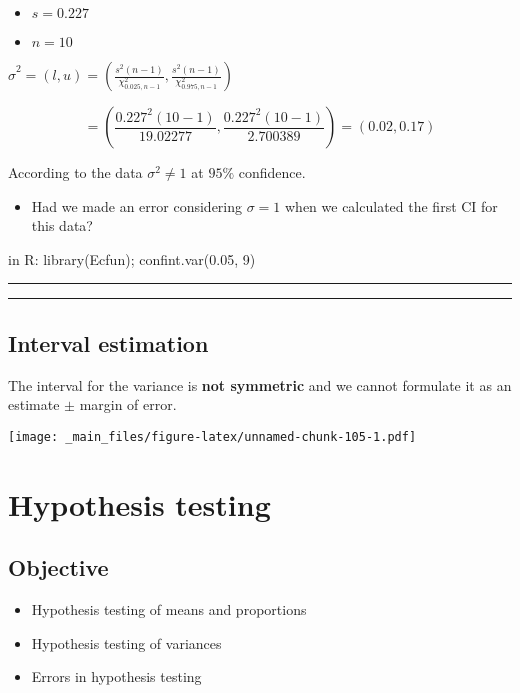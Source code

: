 \documentclass[
]{book}
\providecommand{\tightlist}{%
  \setlength{\itemsep}{0pt}\setlength{\parskip}{0pt}}
\begin{document}
\begin{itemize}
\tightlist
\item
  \(s=0.227\)
\item
  \(n=10\)
\end{itemize}

\(\hat{\sigma}^2=(l,u) = (\frac{s^2 (n-1)}{\chi^2_{0.025,n-1}},\frac{s^2(n-1)}{\chi^2_{0.975,n-1}})\)

\[= (\frac{0.227^2 (10-1)}{19.02277},\frac{0.227^2(10-1)}{2.700389})=(0.02,0.17)\]

According to the data \(\sigma^2 \neq 1\) at \(95\%\) confidence.

\begin{itemize}
\tightlist
\item
  Had we made an error considering \(\sigma=1\) when we calculated the first CI for this data?
\end{itemize}

in R: library(Ecfun);
confint.var(0.05, 9)

\begin{center}\rule{0.5\linewidth}{0.5pt}\end{center}

\begin{center}\rule{0.5\linewidth}{0.5pt}\end{center}

\hypertarget{interval-estimation-10}{%
\section{Interval estimation}\label{interval-estimation-10}}

The interval for the variance is \textbf{not symmetric} and we cannot formulate it as an estimate \(\pm\) margin of error.

\texttt{[image: \_main\_files/figure-latex/unnamed-chunk-105-1.pdf]}

\hypertarget{hypothesis-testing}{%
\chapter{Hypothesis testing}\label{hypothesis-testing}}

\hypertarget{objective-13}{%
\section{Objective}\label{objective-13}}

\begin{itemize}
\tightlist
\item
  Hypothesis testing of means and proportions
\item
  Hypothesis testing of variances
\item
  Errors in hypothesis testing
\end{itemize}
\end{document}
